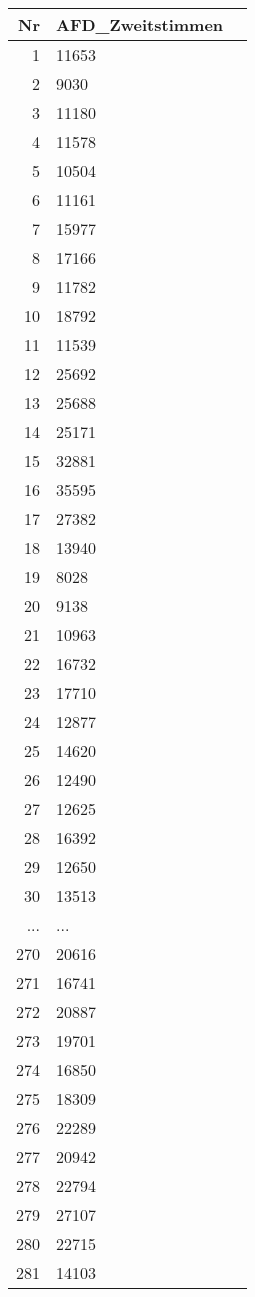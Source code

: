 \documentclass[11pt]{article}
\begin{document}
    \begin{tabular}{r|ll}
 Nr & AFD\_Zweitstimmen\\
\hline
	  1    & 11653\\
	  2    &  9030\\
	  3    & 11180\\
	  4    & 11578\\
	  5    & 10504\\
	  6    & 11161\\
	  7    & 15977\\
	  8    & 17166\\
	  9    & 11782\\
	 10    & 18792\\
	 11    & 11539\\
	 12    & 25692\\
	 13    & 25688\\
	 14    & 25171\\
	 15    & 32881\\
	 16    & 35595\\
	 17    & 27382\\
	 18    & 13940\\
	 19    &  8028\\
	 20    &  9138\\
	 21    & 10963\\
	 22    & 16732\\
	 23    & 17710\\
	 24    & 12877\\
	 25    & 14620\\
	 26    & 12490\\
	 27    & 12625\\
	 28    & 16392\\
	 29    & 12650\\
	 30    & 13513\\
	 ... & ...\\
	 270   & 20616\\
	 271   & 16741\\
	 272   & 20887\\
	 273   & 19701\\
	 274   & 16850\\
	 275   & 18309\\
	 276   & 22289\\
	 277   & 20942\\
	 278   & 22794\\
	 279   & 27107\\
	 280   & 22715\\
	 281   & 14103\\

\end{tabular}
\end{document}
